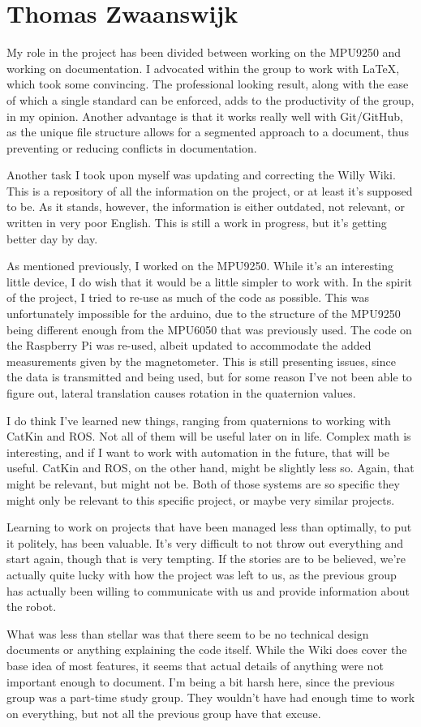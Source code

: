 \section{Thomas Zwaanswijk}
My role in the project has been divided between working on the MPU9250 and working on documentation.
I advocated within the group to work with \LaTeX , which took some convincing.
The professional looking result, along with the ease of which a single standard can be enforced, adds to the productivity of the group, in my opinion.
Another advantage is that it works really well with Git/GitHub, as the unique file structure allows for a segmented approach to a document, thus preventing or reducing conflicts in documentation.

Another task I took upon myself was updating and correcting the Willy Wiki.
This is a repository of all the information on the project, or at least it's supposed to be.
As it stands, however, the information is either outdated, not relevant, or written in very poor English.
This is still a work in progress, but it's getting better day by day.

As mentioned previously, I worked on the MPU9250.
While it's an interesting little device, I do wish that it would be a little simpler to work with.
In the spirit of the project, I tried to re-use as much of the code as possible.
This was unfortunately impossible for the arduino, due to the structure of the MPU9250 being different enough from the MPU6050 that was previously used.
The code on the Raspberry Pi was re-used, albeit updated to accommodate the added measurements given by the magnetometer.
This is still presenting issues, since the data is transmitted and being used, but for some reason I've not been able to figure out, lateral translation causes rotation in the quaternion values.

I do think I've learned new things, ranging from quaternions to working with CatKin and ROS.
Not all of them will be useful later on in life.
Complex math is interesting, and if I want to work with automation in the future, that will be useful.
CatKin and ROS, on the other hand, might be slightly less so.
Again, that might be relevant, but might not be.
Both of those systems are so specific they might only be relevant to this specific project, or maybe very similar projects.

Learning to work on projects that have been managed less than optimally, to put it politely, has been valuable.
It's very difficult to not throw out everything and start again, though that is very tempting.
If the stories are to be believed, we're actually quite lucky with how the project was left to us, as the previous group has actually been willing to communicate with us and provide information about the robot.

What was less than stellar was that there seem to be no technical design documents or anything explaining the code itself.
While the Wiki does cover the base idea of most features, it seems that actual details of anything were not important enough to document.
I'm being a bit harsh here, since the previous group was a part-time study group.
They wouldn't have had enough time to work on everything, but not all the previous group have that excuse.


\newpage